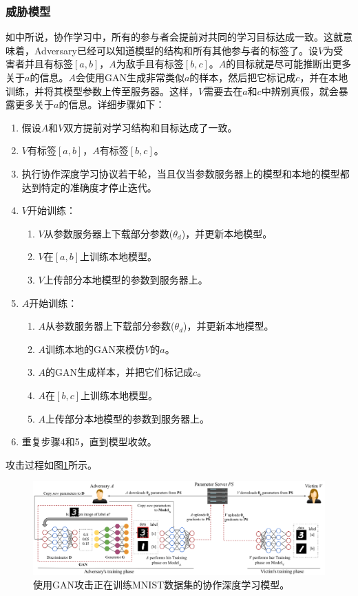 \documentclass[a4paper]{article}
\begin{document}
\subsubsection{威胁模型}
如\cite{shokri2015privacy}中所说，协作学习中，所有的参与者会提前对共同的学习目标达成一致。这就意味着，Adversary已经可以知道模型的结构和所有其他参与者的标签了。设$V$为受害者并且有标签$[a,b]$，$A$为敌手且有标签$[b,c]$。$A$的目标就是尽可能推断出更多关于$a$的信息。$A$会使用GAN生成非常类似$a$的样本，然后把它标记成$c$，并在本地训练，并将其模型参数上传至服务器。这样，$V$需要去在$a$和$c$中辨别真假，就会暴露更多关于$a$的信息。详细步骤如下：
\begin{enumerate}
\item 假设$A$和$V$双方提前对学习结构和目标达成了一致。
\item $V$有标签$[a,b]$，$A$有标签$[b,c]$。
\item 执行协作深度学习协议若干轮，当且仅当参数服务器上的模型和本地的模型都达到特定的准确度才停止迭代。
\item $V$开始训练：
	\begin{enumerate}
	\item $V$从参数服务器上下载部分参数($\theta_d$)，并更新本地模型。
	\item $V$在$[a,b]$上训练本地模型。
	\item $V$上传部分本地模型的参数到服务器上。
	\end{enumerate}
\item $A$开始训练：
	\begin{enumerate}
	\item $A$从参数服务器上下载部分参数($\theta_d$)，并更新本地模型。
	\item $A$训练本地的GAN来模仿$V$的$a$。
	\item $A$的GAN生成样本，并把它们标记成$c$。
	\item $A$在$[b,c]$上训练本地模型。
	\item $A$上传部分本地模型的参数到服务器上。
	\end{enumerate}
\item 重复步骤4和5，直到模型收敛。
\end{enumerate}
攻击过程如图\ref*{fig:ganscenario}所示。

\begin{figure}[!ht]
\includegraphics[width = \linewidth]{fig/ganscenario_new.pdf}
\caption{使用GAN攻击正在训练MNIST数据集的协作深度学习模型。}
\label{fig:ganscenario}
\end{figure}
\end{document}
